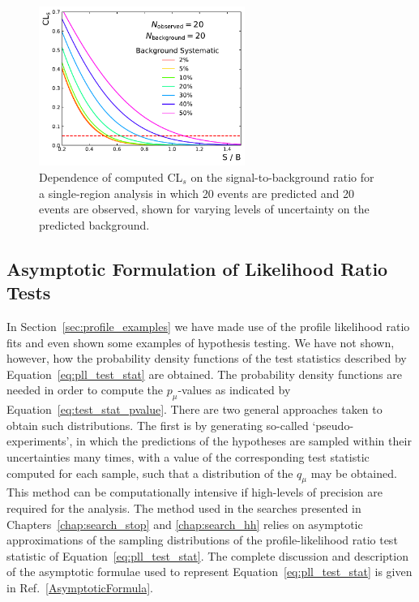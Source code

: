 \begin{figure}[!htb]
    \begin{center}
        \includegraphics[width=0.6\textwidth]{figures/common_ana/stat_hypo/cls_bkguncert_scan}
        \caption{
            Dependence of computed CL$_s$ on the signal-to-background ratio for a single-region
            analysis in which 20 events are predicted and 20 events are observed, shown
            for varying levels of uncertainty on the predicted background.
        }
        \label{fig:cls_scan_uncert}
    \end{center}
\end{figure}

\FloatBarrier
\subsection{Asymptotic Formulation of Likelihood Ratio Tests}
\label{sec:asymptotics}

In Section~\ref{sec:profile_examples} we have made use of the profile likelihood ratio fits and
even shown some examples of hypothesis testing.
We have not shown, however, how the probability density functions of the test statistics described
by Equation~\ref{eq:pll_test_stat} are obtained.
The probability density functions are needed in order to compute the $p_{\mu}$-values as indicated
by Equation~\ref{eq:test_stat_pvalue}.
There are two general approaches taken to obtain such distributions.
The first is by generating so-called `pseudo-experiments', in which the predictions of the hypotheses are sampled within their uncertainties many times,
with a value of the corresponding test statistic computed for each sample, such that a distribution
of the $q_{\mu}$ may be obtained.
This method can be computationally intensive if high-levels
of precision are required for the analysis.
The method used in the searches presented in Chapters~\ref{chap:search_stop} and \ref{chap:search_hh}
relies on asymptotic approximations of the sampling distributions of the 
profile-likelihood ratio test statistic of Equation~\ref{eq:pll_test_stat}.
The complete discussion and description of the asymptotic formulae used to represent
Equation~\ref{eq:pll_test_stat} is given in Ref.~\ref{AsymptoticFormula}.


